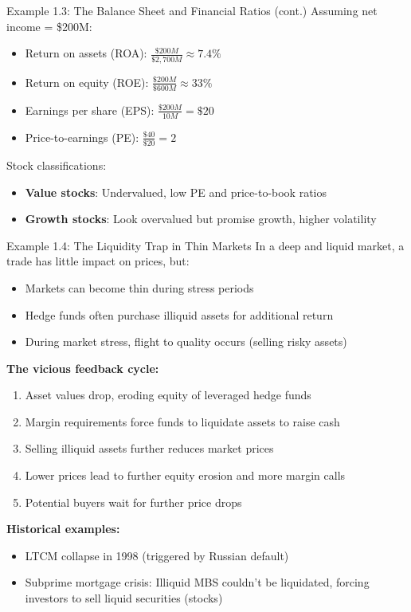 \documentclass[10pt]{beamer}
\begin{document}
\begin{frame}{Example 1.3: The Balance Sheet and Financial Ratios (cont.)}
  Assuming net income = \$200M:
  
  \begin{itemize}
    \item Return on assets (ROA): $\tfrac{\$200M}{\$2,700M} \approx 7.4\%$
    \item Return on equity (ROE): $\tfrac{\$200M}{\$600M} \approx 33\%$
    \item Earnings per share (EPS): $\tfrac{\$200M}{10M} = \$20$
    \item Price-to-earnings (PE): $\tfrac{\$40}{\$20} = 2$
  \end{itemize}
  
  \pause
  Stock classifications:
  \begin{itemize}
    \item \textbf{Value stocks}: Undervalued, low PE and price-to-book ratios
    \item \textbf{Growth stocks}: Look overvalued but promise growth, higher volatility
  \end{itemize}
\end{frame}

\begin{frame}{Example 1.4: The Liquidity Trap in Thin Markets}
  In a deep and liquid market, a trade has little impact on prices, but:
  \begin{itemize}
    \item Markets can become thin during stress periods
    \item Hedge funds often purchase illiquid assets for additional return
    \item During market stress, flight to quality occurs (selling risky assets)
  \end{itemize}
  
  \pause
  \textbf{The vicious feedback cycle:}
  \begin{enumerate}
    \item Asset values drop, eroding equity of leveraged hedge funds
    \item Margin requirements force funds to liquidate assets to raise cash
    \item Selling illiquid assets further reduces market prices
    \item Lower prices lead to further equity erosion and more margin calls
    \item Potential buyers wait for further price drops
  \end{enumerate}
  
  \pause
  \textbf{Historical examples:}
  \begin{itemize}
    \item LTCM collapse in 1998 (triggered by Russian default)
    \item Subprime mortgage crisis: Illiquid MBS couldn't be liquidated,
          forcing investors to sell liquid securities (stocks)
  \end{itemize}
\end{frame}
\end{document}
